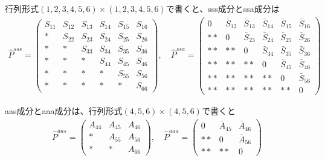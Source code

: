 \documentclass[11pt]{easymemo}
\begin{document}
行列形式$(1,2,3,4,5,6)\times(1,2,3,4,5,6)$で書くと、sss成分とssa成分は
\begin{align}
\hat{P}^{sss}=\begin{pmatrix}
S_{11} & S_{12} & S_{13} & S_{14} & S_{15} & S_{16} \\
*      & S_{22} & S_{23} & S_{24} & S_{25} & S_{26} \\
*      & *      & S_{33} & S_{34} & S_{35} & S_{36} \\
*      & *      & *      & S_{44} & S_{45} & S_{46} \\
*      & *      & *      & *      & S_{55} & S_{56} \\
*      & *      & *      & *      & *      & S_{66}
\end{pmatrix},
\quad
\hat{P}^{ssa}=\begin{pmatrix}
0 & \bar{S}_{12} & \bar{S}_{13} & \bar{S}_{14} & \bar{S}_{15} & \bar{S}_{16} \\
**      & 0 & \bar{S}_{23} & \bar{S}_{24} & \bar{S}_{25} & \bar{S}_{26} \\
**      & **      & 0 & \bar{S}_{34} & \bar{S}_{35} & \bar{S}_{36} \\
**      & **      & **      & 0 & \bar{S}_{45} & \bar{S}_{46} \\
**      & **      & **      & **      & 0 & \bar{S}_{56} \\
**      & **      & **      & **      & **      & 0
\end{pmatrix}
\end{align}

aas成分とaaa成分は、行列形式$(4,5,6)\times(4,5,6)$で書くと
\begin{align}
\hat{P}^{aas}=\begin{pmatrix}
A_{44} & A_{45} & A_{46} \\
*      & A_{55} & A_{56} \\
*      & *      & A_{66}
\end{pmatrix},
\quad
\hat{P}^{aaa}=\begin{pmatrix}
0  & \bar{A}_{45} & \bar{A}_{46} \\
** & 0            & \bar{A}_{56} \\
** & **           & 0
\end{pmatrix}
\end{align}
\end{document}
